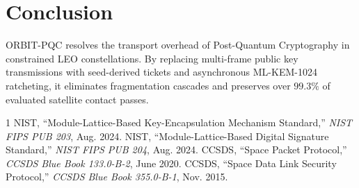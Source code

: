 \documentclass[lettersize,journal]{IEEEtran}
\begin{document}
\section{Conclusion}
ORBIT-PQC resolves the transport overhead of Post-Quantum Cryptography in constrained LEO constellations. By replacing multi-frame public key transmissions with seed-derived tickets and asynchronous ML-KEM-1024 ratcheting, it eliminates fragmentation cascades and preserves over $99.3\%$ of evaluated satellite contact passes.

\begin{thebibliography}{1}
NIST, ``Module-Lattice-Based Key-Encapsulation Mechanism Standard,'' \emph{NIST FIPS PUB 203}, Aug. 2024.
NIST, ``Module-Lattice-Based Digital Signature Standard,'' \emph{NIST FIPS PUB 204}, Aug. 2024.
CCSDS, ``Space Packet Protocol,'' \emph{CCSDS Blue Book 133.0-B-2}, June 2020.
CCSDS, ``Space Data Link Security Protocol,'' \emph{CCSDS Blue Book 355.0-B-1}, Nov. 2015.
\end{thebibliography}
\end{document}
